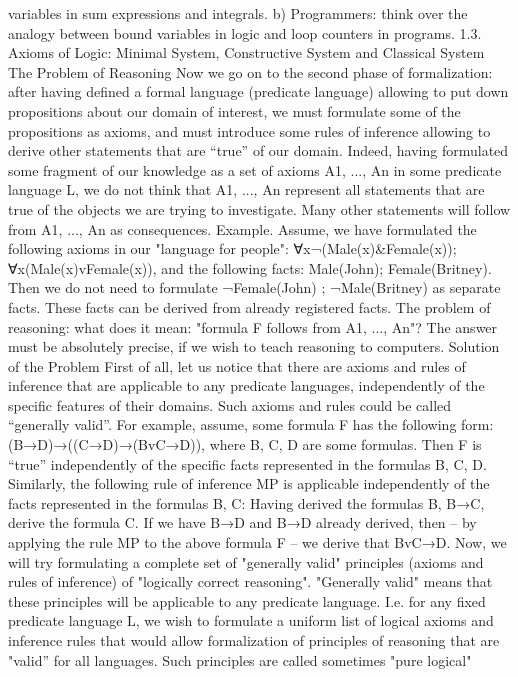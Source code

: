 variables in sum expressions and integrals.
b) Programmers: think over the analogy between bound variables in logic and loop counters in programs.
1.3. Axioms of Logic: Minimal System, Constructive System and Classical System
The Problem of Reasoning
Now we go on to the second phase of formalization: after having defined a formal language (predicate
language) allowing to put down propositions about our domain of interest, we must formulate some of the
propositions as axioms, and must introduce some rules of inference allowing to derive other statements
that are “true” of our domain.
Indeed, having formulated some fragment of our knowledge as a set of axioms A1, ..., An in some
predicate language L, we do not think that A1, ..., An represent all statements that are true of the objects
we are trying to investigate. Many other statements will follow from A1, ..., An as consequences.
Example. Assume, we have formulated the following axioms in our "language for people":
∀x¬(Male(x)&Female(x)); ∀x(Male(x)vFemale(x)), and the following facts: Male(John);
Female(Britney). Then we do not need to formulate ¬Female(John) ; ¬Male(Britney) as separate facts.
These facts can be derived from already registered facts.
The problem of reasoning: what does it mean: "formula F follows from A1, ..., An"? The answer must be
absolutely precise, if we wish to teach reasoning to computers.
Solution of the Problem
First of all, let us notice that there are axioms and rules of inference that are applicable to any predicate
languages, independently of the specific features of their domains. Such axioms and rules could be called
“generally valid”.
For example, assume, some formula F has the following form:
(B→D)→((C→D)→(BvC→D)),
where B, C, D are some formulas. Then F is “true” independently of the specific facts represented in the
formulas B, C, D.
Similarly, the following rule of inference MP is applicable independently of the facts represented in the
formulas B, C:
Having derived the formulas B, B→C, derive the formula C.
If we have B→D and B→D already derived, then – by applying the rule MP to the above formula F – we
derive that BvC→D.
Now, we will try formulating a complete set of "generally valid" principles (axioms and rules of
inference) of "logically correct reasoning". "Generally valid" means that these principles will be
applicable to any predicate language. I.e. for any fixed predicate language L, we wish to formulate a
uniform list of logical axioms and inference rules that would allow formalization of principles of
reasoning that are "valid” for all languages. Such principles are called sometimes "pure logical"
